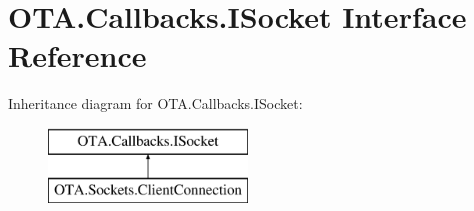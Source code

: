 \hypertarget{interface_o_t_a_1_1_callbacks_1_1_i_socket}{}\section{O\+T\+A.\+Callbacks.\+I\+Socket Interface Reference}
\label{interface_o_t_a_1_1_callbacks_1_1_i_socket}
Inheritance diagram for O\+T\+A.\+Callbacks.\+I\+Socket\+:\begin{figure}[H]
\begin{center}
\leavevmode
\includegraphics[height=2.000000cm]{interface_o_t_a_1_1_callbacks_1_1_i_socket}
\end{center}
\end{figure}

